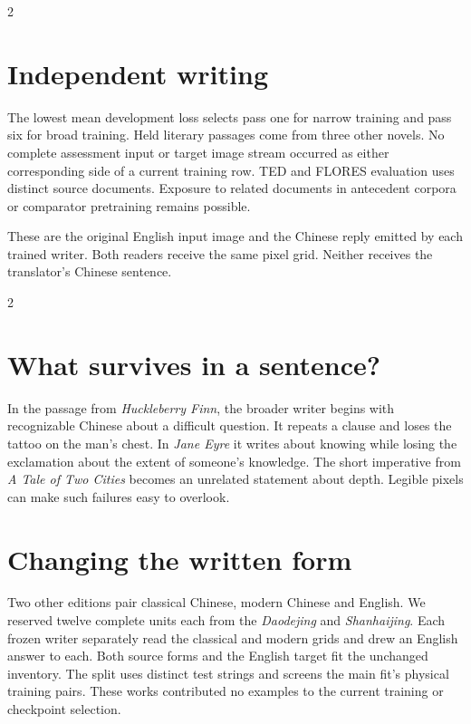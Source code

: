 \begin{multicols}{2}
\section*{Independent writing}
The lowest mean development loss selects pass one for narrow training and pass six for broad training. Held literary passages come from three other novels. No complete assessment input or target image stream occurred as either corresponding side of a current training row. TED and FLORES evaluation uses distinct source documents. Exposure to related documents in antecedent corpora or comparator pretraining remains possible.

\end{multicols}
\newpage
{}
\noindent These are the original English input image and the Chinese reply emitted by each trained writer. Both readers receive the same pixel grid. Neither receives the translator's Chinese sentence.
\begin{multicols}{2}
\section*{What survives in a sentence?}
In the passage from \textit{Huckleberry Finn}, the broader writer begins with recognizable Chinese about a difficult question. It repeats a clause and loses the tattoo on the man's chest. In \textit{Jane Eyre} it writes about knowing while losing the exclamation about the extent of someone's knowledge. The short imperative from \textit{A Tale of Two Cities} becomes an unrelated statement about depth. Legible pixels can make such failures easy to overlook.
\section*{Changing the written form}
Two other editions pair classical Chinese, modern Chinese and English. We reserved twelve complete units each from the \textit{Daodejing} and \textit{Shanhaijing}. Each frozen writer separately read the classical and modern grids and drew an English answer to each. Both source forms and the English target fit the unchanged inventory. The split uses distinct test strings and screens the main fit's physical training pairs. These works contributed no examples to the current training or checkpoint selection.

\end{multicols}
